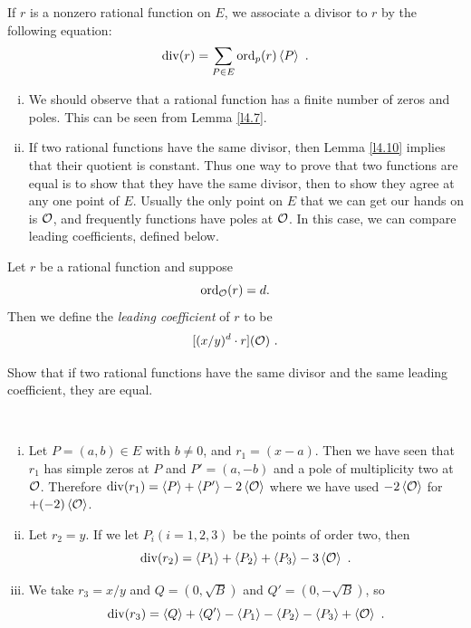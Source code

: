 If $r$ is a nonzero rational function on $E$, we associate a divisor to $r$ by the following equation:
$$
\on{div}(r)=\sum_{P\in E}\ord{p}(r) \divisor{P}\ .
$$

\rems 

\begin{enumerate}[(i)]
\item
We should observe that a rational function has a finite number of zeros and poles. This can be seen from Lemma \ref{l4.7}.
\item
If two rational functions have the same divisor, then Lemma \ref{l4.10} implies that their quotient is constant. Thus one way to prove that two functions are equal is to show that they have the same divisor, then to show they agree at any one point of $E$. Usually the only point on $E$ that we can get our hands on is $\mathcal{O}$, and frequently functions have poles at $\mathcal{O}$. In this case, we can compare leading coefficients, defined below.
\end{enumerate}

\begin{defi}
\label{d5.3}
Let $r$ be a rational function and suppose \[\operatorname{ord}_{\mathcal{O}}(r)=d.\] Then we define the {\it leading coefficient} of $r$ to be
$$[(x/y)^{d}\cdot r](\cuz)\ .$$
\end{defi}

\begin{exo}
\label{e5.4}
Show that if two rational functions have the same divisor and the same leading coefficient, they are equal.
\end{exo}

\begin{example}
\label{e5.5}
~
\begin{enumerate}[(i)]
\item
Let $P=(a,b)\in E$ with $b\neq 0$, and $r_{1}=(x-a)$. Then we have seen that $r_{1}$ has simple zeros at $P$ and $P'=(a,-b)$ and a pole of multiplicity two at $\mathcal{O}$. Therefore $\operatorname{div}(r_{1})=\left\langle P \right \rangle + \left\langle P' \right \rangle - 2 \left\langle \mathcal{O} \right \rangle$ where we have used $-2\left\langle \mathcal{O} \right \rangle$ for $+(-2)\left\langle \mathcal{O} \right \rangle$.
\item
Let $r_{2}=y$. If we let $P_{i}(i=1,2,3)$ be the points of order two, then 
$$\operatorname{div}(r_{2})=\left\langle P_{1} \right \rangle + \left\langle P_{2} \right \rangle + \left\langle P_{3} \right \rangle - 3 \left\langle \mathcal{O} \right \rangle\ .$$
\item
We take $r_{3}=x/y$ and $Q=(0,\sqrt{B})$ and $Q'=(0,-\sqrt{B})$, so
$$\operatorname{div}(r_{3})=\left\langle Q \right \rangle + \left\langle Q' \right \rangle - \left\langle P_{1} \right \rangle - \left\langle P_{2} \right \rangle - \left\langle P_{3} \right \rangle + \left\langle \mathcal{O} \right \rangle\ .$$
\end{enumerate}
\end{example}


